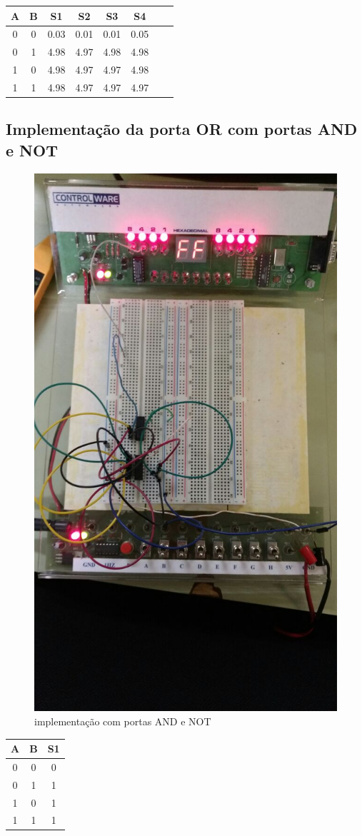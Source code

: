 \documentclass[12pt]{article}
\begin{document}
\begin{table}[H]
	\centering
	\begin{tabular}{|c|c|c|c|c|c|c|c|}
	\cline{1-6}
	\multicolumn{1}{|c|}{A} & \multicolumn{1}{|c|}{B} & \multicolumn{1}{|c|}{S1} & \multicolumn{1}{|c|}{S2} & \multicolumn{1}{|c|}{S3} & \multicolumn{1}{|c|}{S4}\\
	\hline
	0 & 0 & 0.03 & 0.01 & 0.01 & 0.05\\
	0 & 1 & 4.98 & 4.97 & 4.98 & 4.98\\
	1 & 0 & 4.98 & 4.97 & 4.97 & 4.98\\
	1 & 1 & 4.98 & 4.97 & 4.97 & 4.97\\
	\hline
	\end{tabular}
	\label{Porta OR}
\end{table}


\subsection{Implementação da porta OR com portas AND e NOT}
\label{sec:NOTAND}

\begin{figure}[H]
\centering
\includegraphics[width=.5\textwidth]{Porta_OR.jpeg}
\caption{implementação com portas AND e NOT}
\label{fig:portaor}
\end{figure}

\begin{table}[H]
	\centering
	\begin{tabular}{|c|c|c|}
	\cline{1-3}
	\multicolumn{1}{|c|}{A} & \multicolumn{1}{|c|}{B} & \multicolumn{1}{|c|}{S1}\\
	\hline
	0 & 0 & 0 \\
	0 & 1 & 1 \\
	1 & 0 & 1 \\
	1 & 1 & 1 \\
	\hline
	\end{tabular}
	\label{ANDNOTOR}
\end{table}
\end{document}
